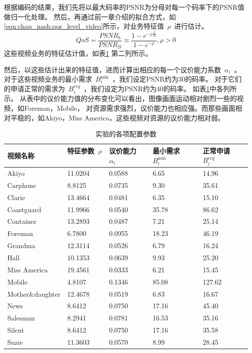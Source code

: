 根据编码的结果，我们先将以最大码率的PSNR为分母对每一个码率下的PSNR值做归一化处理。
然后，再通过前一章介绍的拟合方式，如\eqref{eqn:chap_nash:qos_level_video}所示，对业务特征值~$\rho$~进行估计。
\begin{equation}
QoS = \frac{PSNR_b}{PSNR_B} \approx \frac{1- e^{-\rho \frac{b}{B} }}{1-e^{-\rho}}, \rho > 0
\label{eqn:chap_nash:qos_level_video}
\end{equation}
这些视频业务的特征估计值，如表\ref{tab:chap_nash:before_simulation} 第二列所示。

然后，以这些估计出来的特征值，进而计算出相应的每一个议价能力系数~$\alpha_i$~。
对于这些视频业务的最小需求~$B_i^{\min}$~，我们设定PSNR约为30的码率。
对于它们的申请正常的需求为~$B_i^{req}$~，我们设定为PSNR约为40的码率。
如表\ref{tab:chap_nash:before_simulation}中各列所示。
从表中的议价能力值的分布变化可以看出，图像画面运动相对剧烈一些的视频，如Foreman，Mobile，
对资源需求强烈，议价能力也相应强。而那些画面相对平稳的，如Akiyo，Miss America，这些视频对资源的议价能力相对弱。
\begin{table}[tb]
    \wuhao
    \centering
    \caption{实验的各项配置参数}
    \begin{tabular*}{0.98\textwidth}{l p{}  p{}  p{}  p{} } 
    \toprule
    视频名称 &特征参数~$\rho$~ & 议价能力~$\alpha_i$~ & 最小需求~$B_i^{\min}$~ & 正常申请~$B_i^{req}$~ \\
    \midrule
Akiyo           	 & 11.0204 & 0.0588 & 6.65 & 14.96  \\ 
Carphone        	 & 8.8125 & 0.0735 & 9.30 & 35.61  \\ 
Clarie          	 & 13.4664 & 0.0481 & 6.35 & 15.10  \\ 
Coastguard      	 & 11.9966 & 0.0540 & 35.78 & 86.62  \\ 
Container       	 & 13.2893 & 0.0487 & 7.21 & 25.14  \\ 
Foreman         	 & 6.7800 & 0.0955 & 18.23 & 46.19  \\ 
Grandma         	 & 12.3114 & 0.0526 & 6.79 & 16.24  \\ 
Hall            	 & 10.1353 & 0.0639 & 9.93 & 25.20  \\ 
Miss America    	 & 19.4561 & 0.0333 & 6.21 & 15.45  \\ 
Mobile          	 & 4.8107 & 0.1346 & 85.08 & 127.62  \\ 
Mother\&daughter	 & 12.4678 & 0.0519 & 6.83 & 16.67  \\ 
News            	 & 8.6412 & 0.0750 & 17.16 & 45.40  \\ 
Salesman        	 & 8.2941 & 0.0781 & 16.53 & 35.16  \\ 
Silent          	 & 8.6412 & 0.0750 & 17.16 & 35.58  \\ 
Suzie           	 & 11.3603 & 0.0570 & 8.99 & 28.45  \\ 
    \bottomrule
         \end{tabular*}
    \label{tab:chap_nash:before_simulation}
\end{table}

